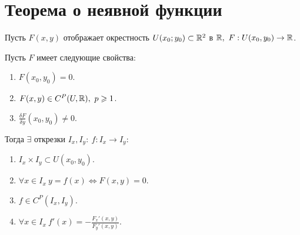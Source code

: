 

\section{Теорема о неявной функции}

\begin{theorem}\label{theorem:1}
    Пусть $ F(x,y) $ отображает окрестность $ U(x_0;y_0) \subset \mathbb{R}^2 $ в $ \R, \ F:U(x_0,y_0)\rightarrow\R $.

    Пусть $ F $ имеет следующие свойства:
    \begin{enumerate}
        \item $ F(x_0,y_0) = 0 $.
        \item $ F(x,y) \in C^P(U,\mathbb{R}), \ p \geqslant 1 $.
        \item $ \frac{\delta F}{\delta y}(x_0,y_0)\ne 0 $.
    \end{enumerate}

    Тогда $ \exists $ открезки $ I_x,I_y: \ f:I_x \rightarrow I_y $:
    \begin{enumerate}
        \item $ I_x \times I_y \subset U(x_0,y_0) $.
        \item $ \forall x \in I_x \ y = f(x) \iff F(x,y) = 0 $.
        \item $ f \in C^P(I_x,I_y) $.
        \item $ \forall x \in I_x \ f'(x) = -\frac{F_x'(x,y)}{F_y'(x,y)} $.
    \end{enumerate}
\end{theorem}

